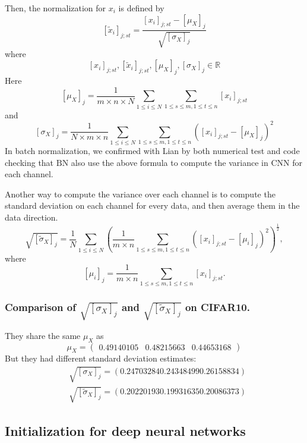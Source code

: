 \documentclass[10pt]{article}
\begin{document}
Then, the normalization for $x_{i}$ is defined by
$$
\left[\tilde{x}_{i}\right]_{j ; s t}=\frac{\left[x_{i}\right]_{j ; s t}-\left[\mu_{X}\right]_{j}}{\sqrt{\left[\sigma_{X}\right]_{j}}}
$$
where
$$
\left[x_{i}\right]_{j ; s t},\left[\tilde{x}_{i}\right]_{j ; s t},\left[\mu_{X}\right]_{j},\left[\sigma_{X}\right]_{j} \in \mathbb{R}
$$
Here
$$
\left[\mu_{X}\right]_{j}=\frac{1}{m \times n \times N} \sum_{1 \leq i \leq N} \sum_{1 \leq s \leq m, 1 \leq t \leq n}\left[x_{i}\right]_{j ; s t}
$$
and
$$
\left[\sigma_{X}\right]_{j}=\frac{1}{N \times m \times n} \sum_{1 \leq i \leq N} \sum_{1 \leq s \leq m, 1 \leq t \leq n}\left(\left[x_{i}\right]_{j ; s t}-\left[\mu_{X}\right]_{j}\right)^{2}
$$
In batch normalization, we confirmed with Lian by both numerical test and code checking that $\mathrm{BN}$ also use the above formula to compute the variance in $\mathrm{CNN}$ for each channel.

Another way to compute the variance over each channel is to compute the standard deviation on each channel for every data, and then average them in the data direction.
$$
\sqrt{\left[\tilde{\sigma}_{X}\right]_{j}}=\frac{1}{N} \sum_{1 \leq i \leq N}\left(\frac{1}{m \times n} \sum_{1 \leq s \leq m, 1 \leq t \leq n}\left(\left[x_{i}\right]_{j ; s t}-\left[\mu_{i}\right]_{j}\right)^{2}\right)^{\frac{1}{2}},
$$
where
$$
\left[\mu_{i}\right]_{j}=\frac{1}{m \times n} \sum_{1 \leq s \leq m, 1 \leq t \leq n}\left[x_{i}\right]_{j ; s t} .
$$

\subsubsection{Comparison of $\sqrt{\left[\sigma_{X}\right]_{j}}$ and $\sqrt{\left[\tilde{\sigma}_{X}\right]_{j}}$ on CIFAR10.}
They share the same $\mu_{X}$ as
$$
\mu_{X}=\left(\begin{array}{lll}
0.49140105 & 0.48215663 & 0.44653168
\end{array}\right)
$$
But they had different standard deviation estimates:
$$
\begin{aligned}
&\sqrt{\left[\sigma_{X}\right]_{j}}=(0.247032840 .243484990 .26158834) \\
&\sqrt{\left[\tilde{\sigma}_{X}\right]_{j}}=(0.202201930 .199316350 .20086373)
\end{aligned}
$$

\subsection{Initialization for deep neural networks}
\end{document}
